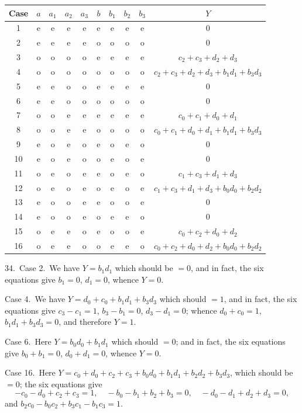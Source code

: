 \documentclass[11pt,a4paper]{book}
\begin{document}
\medskip
\begin{center}
\begin{tabular}{c|cccc|cccc|c}
Case & $a$ & $a_1$ & $a_2$ & $a_3$ & $b$ & $b_1$ & $b_2$ & $b_3$ & $Y$ \\
\hline
1 & e & e & e & e & e & e & e & e & 0 \\
2 & e & e & e & e & o & o & o & o & 0 \\
3 & o & o & o & o & e & e & e & e & $c_2 + c_3 + d_2 + d_3$ \\
4 & o & o & o & o & o & o & o & o & $c_2 + c_3 + d_2 + d_3 + b_1d_1 + b_3d_3$ \\
5 & e & e & o & o & e & e & e & e & 0 \\
6 & e & e & o & o & o & o & o & o & 0 \\
7 & o & o & e & e & e & e & e & e & $c_0 + c_1 + d_0 + d_1$ \\
8 & o & o & e & e & o & o & o & o & $c_0 + c_1 + d_0 + d_1 + b_1d_1 + b_3d_3$ \\
9 & e & o & e & o & e & o & e & o & 0 \\
10 & e & o & e & o & o & e & o & e & 0 \\
11 & o & e & o & e & e & o & e & o & $c_1 + c_3 + d_1 + d_3$ \\
12 & o & e & o & e & o & e & o & e & $c_1 + c_3 + d_1 + d_3 + b_0d_0 + b_2d_2$ \\
13 & e & o & o & e & e & o & o & e & 0 \\
14 & e & o & o & e & o & e & e & o & 0 \\
15 & o & e & e & o & e & o & o & e & $c_0 + c_2 + d_0 + d_2$ \\
16 & o & e & e & o & o & e & e & o & $c_0 + c_2 + d_0 + d_2 + b_0d_0 + b_2d_2$
\end{tabular}
\end{center}
\medskip

34.\ Case 2.\ We have $Y = b_1d_1$ which should be $= 0$, and in fact, the six equations give $b_1 = 0$, $d_1 = 0$, whence $Y = 0$.

Case 4.\ We have $Y = d_0 + c_0 + b_1d_1 + b_3d_3$ which should $= 1$, and in fact, the six equations give $c_3 - c_1 = 1$, $b_3 - b_1 = 0$, $d_3 - d_1 = 0$; whence $d_0 + c_0 = 1$, $b_1d_1 + b_3d_3 = 0$, and therefore $Y = 1$.

Case 6.\ Here $Y = b_0d_0 + b_1d_1$ which should $= 0$; and in fact, the six equations give $b_0 + b_1 = 0$, $d_0 + d_1 = 0$, whence $Y = 0$.

Case 16.\ Here $Y = c_0 + d_0 + c_2 + c_3 + b_0d_0 + b_1d_1 + b_2d_2 + b_3d_3$, which should be $= 0$; the six equations give
\[
-c_0 - d_0 + c_2 + c_3 = 1, \quad -b_0 - b_1 + b_2 + b_3 = 0, \quad -d_0 - d_1 + d_2 + d_3 = 0,
\]
and $b_2c_0 - b_0c_2 + b_3c_1 - b_1c_3 = 1$.
\end{document}
